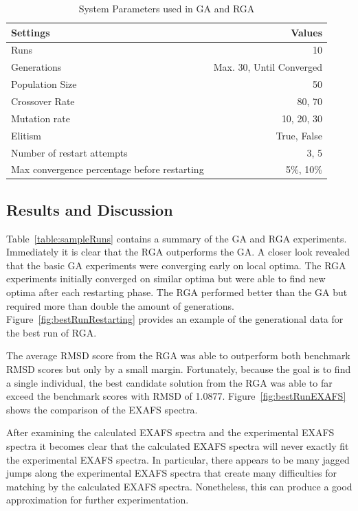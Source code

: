 \documentclass[conference]{IEEEtran}
\begin{document}
\begin{table}
\caption{System Parameters used in GA and RGA}
\label{table:gaParameters}
\centering
\begin{tabular}{ | l | r | }
  \hline
    Settings & Values \\ \hline \hline
    Runs & 10 \\ \hline
    Generations & Max. 30, Until Converged \\ \hline
    Population Size & 50 \\ \hline
    Crossover Rate & 80, 70 \\ \hline
    Mutation rate & 10, 20, 30 \\ \hline
    Elitism & True, False \\ \hline
    Number of restart attempts & 3, 5 \\ \hline
    Max convergence percentage before restarting & 5\%, 10\% \\ \hline
\end{tabular}
\end{table}

\subsection{Results and Discussion}

Table~\ref{table:sampleRuns} contains a summary of the GA and RGA experiments. Immediately it is clear that the RGA outperforms the GA. A closer look revealed that the basic GA experiments were converging early on local optima. The RGA experiments initially converged on similar optima but were able to find new optima after each restarting phase. The RGA performed better than the GA but required more than double the amount of generations. Figure~\ref{fig:bestRunRestarting} provides an example of the generational data for the best run of RGA.

The average RMSD score from the RGA was able to outperform both benchmark RMSD scores but only by a small margin. Fortunately, because the goal is to find a single individual, the best candidate solution from the RGA was able to far exceed the benchmark scores with RMSD of 1.0877. Figure~\ref{fig:bestRunEXAFS} shows the comparison of the EXAFS spectra.

After examining the calculated EXAFS spectra and the experimental EXAFS spectra it becomes clear that the calculated EXAFS spectra will never exactly fit the experimental EXAFS spectra. In particular, there appears to be many jagged jumps along the experimental EXAFS spectra that create many difficulties for matching by the calculated EXAFS spectra. Nonetheless, this can produce a good approximation for further experimentation.
\end{document}
